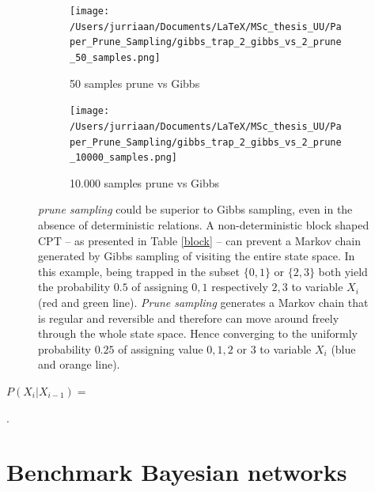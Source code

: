 \documentclass[a4paper, twoside, 11pt]{report}
\theoremstyle{plain}
\theoremstyle{definition}
\theoremstyle{remark}
\newcommand{\ps}{\textit{prune sampling }}
\begin{document}
\begin{figure}[h]
\centering
\begin{subfigure}{.49\textwidth}
  \centering
  \texttt{[image: /Users/jurriaan/Documents/LaTeX/MSc\_thesis\_UU/Paper\_Prune\_Sampling/gibbs\_trap\_2\_gibbs\_vs\_2\_prune\_50\_samples.png]}
  \caption{50 samples prune vs Gibbs}
  \label{fig:sub1}
\end{subfigure}
\begin{subfigure}{.49\textwidth}
  \centering
  \texttt{[image: /Users/jurriaan/Documents/LaTeX/MSc\_thesis\_UU/Paper\_Prune\_Sampling/gibbs\_trap\_2\_gibbs\_vs\_2\_prune\_10000\_samples.png]}
  \caption{10.000 samples prune vs Gibbs}
  \label{fig:sub2}
\end{subfigure}
\vspace{0.75pc}
\caption{\ps could be superior to Gibbs sampling, even in the absence of deterministic relations. A non-deterministic block shaped CPT -- as presented in Table \ref{block} -- can prevent a Markov chain generated by Gibbs sampling of visiting the entire state space. In this example, being trapped in the subset $\{0, 1\}$ or $\{2, 3\}$ both yield the probability $0.5$ of assigning $0,1$ respectively $2,3$ to variable $X_i$ (red and green line). \textit{Prune sampling} generates a Markov chain that is regular and reversible and therefore can move around freely through the whole state space. Hence converging to the uniformly probability $0.25$ of assigning value $0,1,2$ or $3$ to variable $X_i$ (blue and orange line).} 
\label{block-BN}
\end{figure}

\vspace{2pc}
$P(X_i |X_{i-1})=$
\begin{table}[h]
\centering
{}.
\caption{a block shaped CPT}
\label{block}
\end{table}

\section{Benchmark Bayesian networks}
\end{document}
